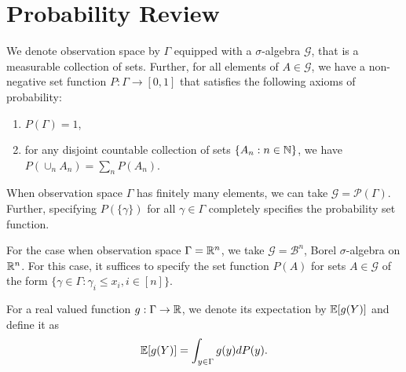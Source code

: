\documentclass[a4paper,english,12pt]{article}
\begin{document}
\section{Probability Review}
We denote observation space by $\Gamma$ equipped with a $\sigma$-algebra $\mathcal{G}$, that is a  measurable collection of sets.
Further, for all elements of $A \in \mathcal{G}$, we have a non-negative set function $P: \Gamma \to [0,1]$ that satisfies the following axioms of probability:
\begin{enumerate}
\item $P(\Gamma) = 1$,
\item for any disjoint countable collection of sets $\{A_n: n \in \mathbb{N}\}$, we have $P(\cup_nA_n) = \sum_n P(A_n)$.
\end{enumerate}
\begin{exmp} When observation space $\Gamma$ has finitely many elements, we can take $\mathcal{G} = \mathcal{P}(\Gamma)$. 
Further, specifying $P(\{\gamma\})$ for all $\gamma \in \Gamma$ completely specifies the probability set function.
\end{exmp}
\begin{exmp} For the case when observation space $\Gamma = \mathbb{R}^n$, we take $\mathcal{G} = \mathcal{B}^n$, Borel $\sigma$-algebra on $\mathbb{R}^n$. 
For this case, it suffices to specify the set function $P(A)$ for  sets $A \in \mathcal{G}$ of the form $\{\gamma \in \Gamma: \gamma_i \leq x_i, i \in [n]\}$.
\end{exmp}
\begin{defn}[Expectation] For a real valued function $g: \Gamma \to \mathbb{R}$, we denote its expectation by $\mathbb{E}[g(Y)]$ and define it as
\begin{align*}
\mathbb{E}[g(Y)] = \int_{y \in \Gamma}g(y)dP(y).
\end{align*}
\end{defn}
\end{document}

